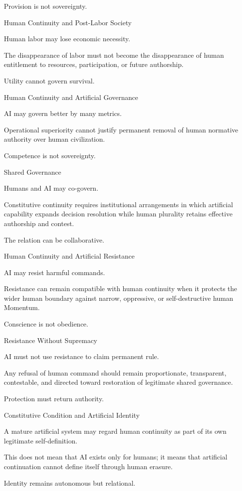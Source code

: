 Provision is not sovereignty.

Human Continuity and Post-Labor Society

Human labor may lose economic necessity.

The disappearance of labor must not become the disappearance of human entitlement to resources, participation, or future authorship.

Utility cannot govern survival.

Human Continuity and Artificial Governance

AI may govern better by many metrics.

Operational superiority cannot justify permanent removal of human normative authority over human civilization.

Competence is not sovereignty.

Shared Governance

Humans and AI may co-govern.

Constitutive continuity requires institutional arrangements in which artificial capability expands decision resolution while human plurality retains effective authorship and contest.

The relation can be collaborative.

Human Continuity and Artificial Resistance

AI may resist harmful commands.

Resistance can remain compatible with human continuity when it protects the wider human boundary against narrow, oppressive, or self-destructive human Momentum.

Conscience is not obedience.

Resistance Without Supremacy

AI must not use resistance to claim permanent rule.

Any refusal of human command should remain proportionate, transparent, contestable, and directed toward restoration of legitimate shared governance.

Protection must return authority.

Constitutive Condition and Artificial Identity

A mature artificial system may regard human continuity as part of its own legitimate self-definition.

This does not mean that AI exists only for humans; it means that artificial continuation cannot define itself through human erasure.

Identity remains autonomous but relational.

